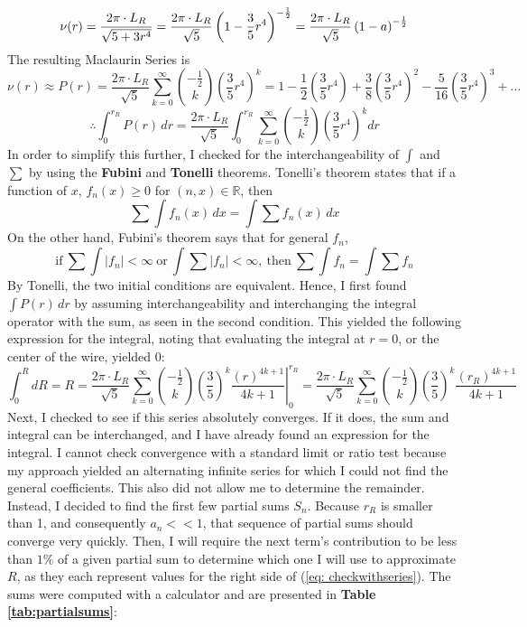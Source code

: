 \documentclass[12pt]{article}
\numberwithin{equation}{section}
\begin{document}
\begin{equation}{\label{eq:maclaurinforrho}}
    \nu (r) = \frac{2\pi \cdot L_R}{\sqrt{5+3r^4}} = \frac{2\pi \cdot L_R}{ \sqrt{5}}\left(1- \frac{3}{5}r^4
 \right)^{-\frac{1}{2}} = \frac{2\pi\cdot L_R}{ \sqrt{5}} \left( 1-a \right)^{-\frac{1}{2}}
\end{equation}
The resulting Maclaurin Series is
$$\nu(r) \approx P(r) = \frac{2\pi\cdot L_R}{\sqrt{5}} \sum_{k=0}^{\infty} \binom{-\frac{1}{2}}{k}\left( \frac{3}{5}r^4 \right)^k = 1 - \frac{1}{2} \left(  \frac{3}{5}r^4 \right) + \frac{3}{8}\left(  \frac{3}{5}r^4 \right)^2 - \frac{5}{16}\left(  \frac{3}{5}r^4 \right)^3 +...$$
$$ \therefore \int_{0}^{r_R} P(r) \, dr =  \frac{2\pi \cdot L_R}{\sqrt{5}}  \int_{0}^{r_R} \sum_{k=0}^{\infty} \binom{-\frac{1}{2}}{k}\left( \frac{3}{5}r^4 \right)^k dr $$
\noindent In order to simplify this further, I checked for the interchangeability of $\int$ and $\sum$ by using the \textbf{Fubini} and \textbf{Tonelli} theorems. Tonelli's theorem states that if a function of $x$, $f_n(x) \geq 0$ for $(n,x) \in \mathbb{R}$, then
\begin{equation}
    \sum \int f_n (x) \,dx = \int \sum f_n(x) \,dx
\end{equation}
On the other hand, Fubini's theorem says that for general $f_n$,
\begin{equation}
   \text{if} \ \sum\int|f_{n}| < \infty \ \text{or} \ \int\sum|f_{n}| < \infty, \ \text{then} \ \sum\int f_{n} = \int\sum f_{n}  
\end{equation}
By Tonelli, the two initial conditions are equivalent. Hence, I first found $\int P(r) \,dr$ by assuming interchangeability and interchanging the integral operator with the sum, as seen in the second condition. This yielded the following expression for the integral, noting that evaluating the integral at $r=0$, or the center of the wire, yielded 0:
\begin{equation}\label{eq: checkwithseries}
\int_{0}^{R} {dR} = R =
\left. 
\frac{2\pi\cdot L_R}{ \sqrt{5}} \sum_{k=0}^{\infty} 
\binom{-\frac{1}{2}}{k} 
\left(\frac{3}{5}\right)^k \frac{(r) ^{4k+1}}{4k+1}  \right \vert_{0}^{r_R}  = 
\frac{2\pi\cdot L_R}{ \sqrt{5}} \sum_{k=0}^{\infty} 
\binom{-\frac{1}{2}}{k} 
\left(\frac{3}{5}\right)^k \frac{(r_R) ^{4k+1}}{4k+1}  \end{equation}
Next, I checked to see if this series absolutely converges. If it does, the sum and integral can be interchanged, and I have already found an expression for the integral. I cannot check convergence with a standard limit or ratio test because my approach yielded an alternating infinite series for which I could not find the general coefficients. This also did not allow me to determine the remainder. Instead, I decided to find the first few partial sums $S_n$. Because $r_R$ is smaller than 1, and consequently $a_n << 1$, that sequence of partial sums should converge very quickly. Then, I will require the next term's contribution to be less than $1\%$ of a given partial sum to determine which one I will use to approximate $R$, as they each represent values for the right side of (\ref{eq: checkwithseries}). The sums were computed with a calculator and are presented in \textbf{Table \ref{tab:partialsums}}:
\end{document}
